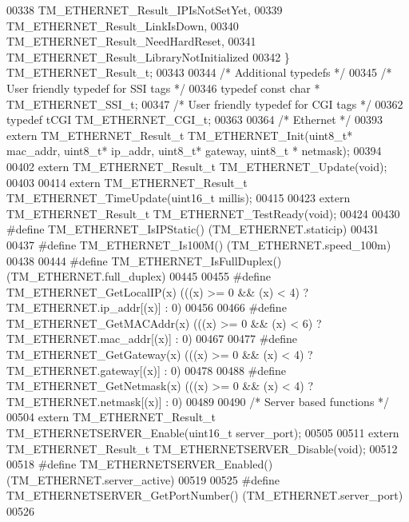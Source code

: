 \begin{DoxyCode}
00338     TM\_ETHERNET\_Result\_IPIsNotSetYet,
00339     TM\_ETHERNET\_Result\_LinkIsDown,
00340     TM\_ETHERNET\_Result\_NeedHardReset,
00341     TM\_ETHERNET\_Result\_LibraryNotInitialized
00342 \} TM\_ETHERNET\_Result\_t;
00343 
00344 \textcolor{comment}{/* Additional typedefs */}
00345 \textcolor{comment}{/* User friendly typedef for SSI tags */}
00346 \textcolor{keyword}{typedef} \textcolor{keyword}{const} \textcolor{keywordtype}{char} * TM\_ETHERNET\_SSI\_t;
00347 \textcolor{comment}{/* User friendly typedef for CGI tags */}
00362 \textcolor{keyword}{typedef} tCGI TM\_ETHERNET\_CGI\_t;
00363 
00364 \textcolor{comment}{/* Ethernet */}
00393 \textcolor{keyword}{extern} TM\_ETHERNET\_Result\_t TM\_ETHERNET\_Init(uint8\_t* mac\_addr, uint8\_t* ip\_addr, uint8\_t* gateway, uint8\_t
      * netmask);
00394 
00402 \textcolor{keyword}{extern} TM\_ETHERNET\_Result\_t TM\_ETHERNET\_Update(\textcolor{keywordtype}{void});
00403 
00414 \textcolor{keyword}{extern} TM\_ETHERNET\_Result\_t TM\_ETHERNET\_TimeUpdate(uint16\_t millis);
00415 
00423 \textcolor{keyword}{extern} TM\_ETHERNET\_Result\_t TM\_ETHERNET\_TestReady(\textcolor{keywordtype}{void});
00424 
00430 \textcolor{preprocessor}{#define TM\_ETHERNET\_IsIPStatic()            (TM\_ETHERNET.staticip)}
00431 
00437 \textcolor{preprocessor}{#define TM\_ETHERNET\_Is100M()                (TM\_ETHERNET.speed\_100m)}
00438 
00444 \textcolor{preprocessor}{#define TM\_ETHERNET\_IsFullDuplex()          (TM\_ETHERNET.full\_duplex)}
00445 
00455 \textcolor{preprocessor}{#define TM\_ETHERNET\_GetLocalIP(x)           (((x) >= 0 && (x) < 4) ? TM\_ETHERNET.ip\_addr[(x)] : 0)}
00456 
00466 \textcolor{preprocessor}{#define TM\_ETHERNET\_GetMACAddr(x)           (((x) >= 0 && (x) < 6) ? TM\_ETHERNET.mac\_addr[(x)] : 0)}
00467 
00477 \textcolor{preprocessor}{#define TM\_ETHERNET\_GetGateway(x)           (((x) >= 0 && (x) < 4) ? TM\_ETHERNET.gateway[(x)] : 0)}
00478 
00488 \textcolor{preprocessor}{#define TM\_ETHERNET\_GetNetmask(x)           (((x) >= 0 && (x) < 4) ? TM\_ETHERNET.netmask[(x)] : 0)}
00489 
00490 \textcolor{comment}{/* Server based functions */}
00504 \textcolor{keyword}{extern} TM\_ETHERNET\_Result\_t TM\_ETHERNETSERVER\_Enable(uint16\_t server\_port);
00505 
00511 \textcolor{keyword}{extern} TM\_ETHERNET\_Result\_t TM\_ETHERNETSERVER\_Disable(\textcolor{keywordtype}{void});
00512 
00518 \textcolor{preprocessor}{#define TM\_ETHERNETSERVER\_Enabled()             (TM\_ETHERNET.server\_active)}
00519 
00525 \textcolor{preprocessor}{#define TM\_ETHERNETSERVER\_GetPortNumber()       (TM\_ETHERNET.server\_port)}
00526 

\end{DoxyCode}
